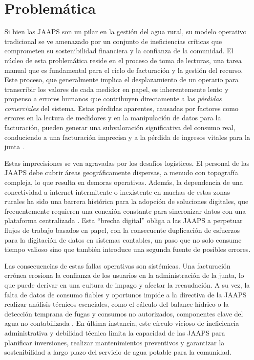 \section{Problemática}
\label{sec:problem_statement}

Si bien las JAAPS son un pilar en la gestión del agua rural, su modelo operativo tradicional se ve amenazado por un conjunto de ineficiencias críticas que comprometen su sostenibilidad financiera y la confianza de la comunidad. El núcleo de esta problemática reside en el proceso de toma de lecturas, una tarea manual que es fundamental para el ciclo de facturación y la gestión del recurso. Este proceso, que generalmente implica el desplazamiento de un operario para transcribir los valores de cada medidor en papel, es inherentemente lento y propenso a errores humanos que contribuyen directamente a las \textit{pérdidas comerciales} del sistema. Estas pérdidas aparentes, causadas por factores como errores en la lectura de medidores y en la manipulación de datos para la facturación, pueden generar una subvaloración significativa del consumo real, conduciendo a una facturación imprecisa y a la pérdida de ingresos vitales para la junta \parencite{ANC2025}.

Estas imprecisiones se ven agravadas por los desafíos logísticos. El personal de las JAAPS debe cubrir áreas geográficamente dispersas, a menudo con topografía compleja, lo que resulta en demoras operativas. Además, la dependencia de una conectividad a internet intermitente o inexistente en muchas de estas zonas rurales ha sido una barrera histórica para la adopción de soluciones digitales, que frecuentemente requieren una conexión constante para sincronizar datos con una plataforma centralizada \parencite{Fieldeke2021}.
Esta ``brecha digital'' obliga a las JAAPS a perpetuar flujos de trabajo basados en papel, con la consecuente duplicación de esfuerzos para la digitación de datos en sistemas contables, un paso que no solo consume tiempo valioso sino que también introduce una segunda fuente de posibles errores.

Las consecuencias de estas fallas operativas son sistémicas. Una facturación errónea erosiona la confianza de los usuarios en la administración de la junta, lo que puede derivar en una cultura de impago y afectar la recaudación. A su vez, la falta de datos de consumo fiables y oportunos impide a la directiva de la JAAPS realizar análisis técnicos esenciales, como el cálculo del balance hídrico o la detección temprana de fugas y consumos no autorizados, componentes clave del agua no contabilizada \parencite{ANC2025}. En última instancia, este círculo vicioso de ineficiencia administrativa y debilidad técnica limita la capacidad de las JAAPS para planificar inversiones, realizar mantenimientos preventivos y garantizar la sostenibilidad a largo plazo del servicio de agua potable para la comunidad.

